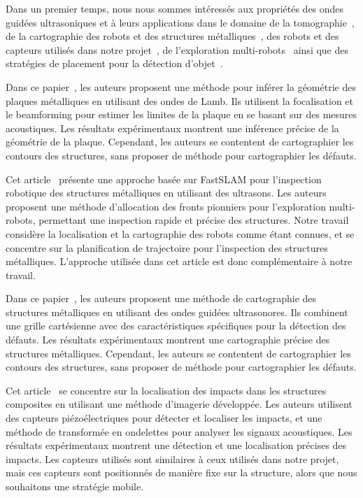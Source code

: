 \documentclass[francais,RandD]{rapportPFE}
\begin{document}
		Dans un premier temps, nous nous sommes intéressés aux propriétés des ondes guidées ultrasoniques et à leurs applications dans le domaine de la tomographie~\cite{OUABI2022106705, HUTHWAITE2013979}, de la cartographie des robots et des structures métalliques~\cite{9364359, 9811581, inventions3030059, 9568841}, des robots et des capteurs utilisés dans notre projet~\cite{s22093235}, de l'exploration multi-robots~\cite{bautin:hal-00757960, articlesvsdf} ainsi que des stratégies de placement pour la détection d'objet~\cite{article455556, 7487624, 7139673}.

		Dans ce papier~\cite{OUABI2022106705}, les auteurs proposent une méthode pour inférer la géométrie des plaques métalliques en utilisant des ondes de Lamb.
		Ils utilisent la focalisation et le beamforming pour estimer les limites de la plaque en se basant sur des mesures acoustiques.
		Les résultats expérimentaux montrent une inférence précise de la géométrie de la plaque.
		Cependant, les auteurs se contentent de cartographier les contours des structures, sans proposer de méthode pour cartographier les défauts.

		Cet article~\cite{9364359} présente une approche basée sur FastSLAM pour l'inspection robotique des structures métalliques en utilisant des ultrasons.
		Les auteurs proposent une méthode d'allocation des fronts pionniers pour l'exploration multi-robots, permettant une inspection rapide et précise des structures.
		Notre travail considère la localisation et la cartographie des robots comme étant connues, et se concentre sur la planification de trajectoire pour l'inspection des structures métalliques.
		L'approche utilisée dans cet article est donc complémentaire à notre travail.

		Dans ce papier~\cite{9811581}, les auteurs proposent une méthode de cartographie des structures métalliques en utilisant des ondes guidées ultrasonores.
		Ils combinent une grille cartésienne avec des caractéristiques spécifiques pour la détection des défauts.
		Les résultats expérimentaux montrent une cartographie précise des structures métalliques.
		Cependant, les auteurs se contentent de cartographier les contours des structures, sans proposer de méthode pour cartographier les défauts.

		Cet article~\cite{inventions3030059} se concentre sur la localisation des impacts dans les structures composites en utilisant une méthode d'imagerie développée.
		Les auteurs utilisent des capteurs piézoélectriques pour détecter et localiser les impacts, et une méthode de transformée en ondelettes pour analyser les signaux acoustiques.
		Les résultats expérimentaux montrent une détection et une localisation précises des impacts.
		Les capteurs utilisés sont similaires à ceux utilisés dans notre projet, mais ces capteurs sont positionnés de manière fixe sur la structure, alors que nous souhaitons une stratégie mobile.
\end{document}
